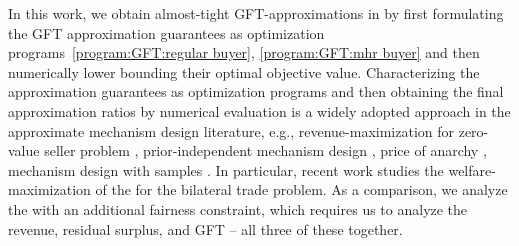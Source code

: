 In this work, we obtain almost-tight GFT-approximations in  by first formulating the GFT approximation guarantees as optimization programs~\ref{program:GFT:regular buyer}, \ref{program:GFT:mhr buyer} and then numerically lower bounding their optimal objective value. Characterizing the approximation guarantees as optimization programs and then obtaining the final approximation ratios by numerical evaluation is a widely adopted approach in the approximate mechanism design literature, e.g., revenue-maximization for zero-value seller problem \citep{AHNPY-18}, prior-independent mechanism design \citep{HJL-19}, price of anarchy \citep{HTW-18}, mechanism design with samples \citep{FHL-21,ABB-22}. In particular, recent work \citep{CW-23,LRW-23} {studies} the welfare-maximization of the {\FixPrice} for the bilateral trade problem. As a comparison, we analyze the {\FixPrice} with an additional fairness constraint, which requires us to analyze the revenue, residual surplus, and GFT -- all three of these together.




